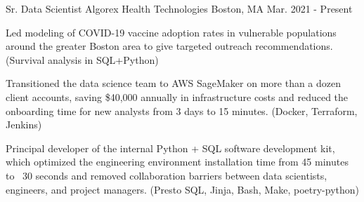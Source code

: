 

\begin{cventries}

  \cventry
    {Sr. Data Scientist} %
    {Algorex Health Technologies} %
    {Boston, MA} %
    {Mar. 2021 - Present} %
    {
      \begin{cvitems} %
      \item {
        Led modeling of COVID-19 vaccine adoption rates in vulnerable
        populations around the greater Boston area to give targeted outreach
        recommendations. (Survival analysis in SQL+Python)
      }
      \item {
        Transitioned the data science team to AWS SageMaker on more than a dozen
        client accounts, saving \$40,000 annually in infrastructure costs and
        reduced the onboarding time for new analysts from 3 days to 15 minutes.
        (Docker, Terraform, Jenkins)
      }
      \item {
        Principal developer of the internal Python + SQL software development
        kit, which optimized the engineering environment installation time from
        45 minutes to ~30 seconds and removed collaboration barriers between
        data scientists, engineers, and project managers. (Presto SQL, Jinja, Bash,
        Make, poetry-python)
      }
      \end{cvitems}
    }


\end{cventries}
